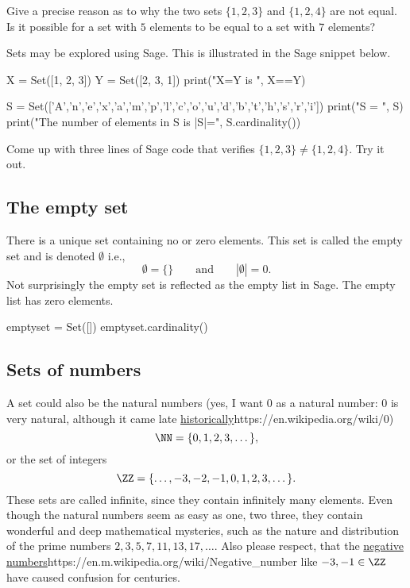 \documentclass{article}
\begin{document}
\beginshex
Give a precise reason as to why the two sets $\{1, 2, 3\}$ and $\{1, 2, 4\}$ are not equal.
Is it possible for a set with $5$ elements to be equal to a set with $7$ elements?
\endshex



Sets may be explored using Sage. This is illustrated in the Sage snippet below. 

\begin{sage}
X = Set([1, 2, 3])
Y = Set([2, 3, 1])
print("X=Y is ", X==Y)

S = Set(['A','n','e','x','a','m','p','l','c','o','u','d','b','t','h','s','r','i'])
print("S = ", S) 
print("The number of elements in S is |S|=", S.cardinality())
\end{sage}

\beginshex
Come up with three lines of Sage code that verifies $\{1, 2, 3\} \neq \{1, 2, 4\}$. Try it out.
\endshex

\subsection{The empty set}

There is a unique set containing no or zero elements. This set is called the empty set and
is denoted $\emptyset$ i.e.,
$$
\emptyset = \{\}\qquad\text{and}\qquad |\emptyset| = 0.
$$
Not surprisingly the empty set is reflected as the empty list in Sage. The empty list
has zero elements.

\begin{sage}
emptyset = Set([])
emptyset.cardinality()
\end{sage}




\subsection{Sets of numbers}

A set could also be the natural numbers (yes, I want $0$ as a natural number:
$0$ is very natural, although it came late \url{historically}{https://en.wikipedia.org/wiki/0})
$$
\NN = \{0, 1, 2, 3, \dots\},
$$
or the set of integers
$$
\ZZ = \{\dots, -3, -2, -1, 0, 1, 2, 3, \dots\}.
$$
These sets are called infinite, since they contain infinitely many elements. Even though
the natural numbers seem as easy as one, two three, they contain wonderful and deep
mathematical mysteries, such as the nature and distribution of the prime numbers
$2, 3, 5, 7, 11, 13, 17, \dots$. Also please respect, that the \url{negative numbers}{https://en.m.wikipedia.org/wiki/Negative_number} like
$-3, -1\in \ZZ$ have caused confusion for centuries.
 
\end{document}
